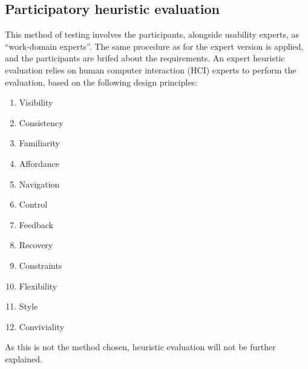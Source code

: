 \subsection{Participatory heuristic evaluation}
This method of testing involves the participants, alongside usability experts, as ``work-domain experts''. The same procedure as for the expert version is applied, and the participants are brifed about the requirements. An expert heuristic evaluation relies on human computer interaction (HCI) experts to perform the evaluation, based on the following design principles:
\begin{enumerate}
	\item Visibility
	\item Consistency
	\item Familiarity
	\item Affordance
	\item Navigation
	\item Control
	\item Feedback
	\item Recovery
	\item Constraints
	\item Flexibility
	\item Style
	\item Conviviality
\end{enumerate}
As this is not the method chosen, heuristic evaluation will not be further explained.